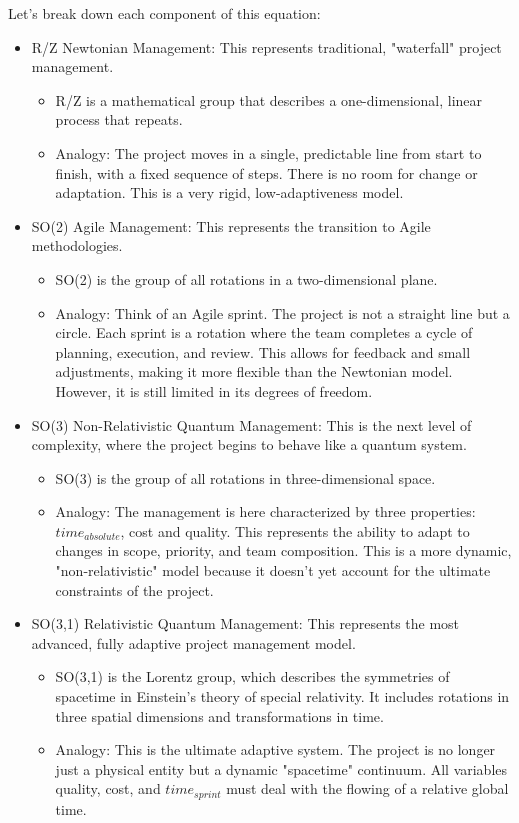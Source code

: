 \documentclass{article}
\begin{document}
Let's break down each component of this equation:
\begin{itemize}
\item R/Z Newtonian Management: This represents traditional, "waterfall" project management.
\begin{itemize}
\item R/Z is a mathematical group that describes a one-dimensional, linear process that repeats.
\item Analogy: The project moves in a single, predictable line from start to finish, with a fixed sequence of steps. There is no room for change or adaptation. This is a very rigid, low-adaptiveness model.
\end{itemize}
\item SO(2) Agile Management: This represents the transition to Agile methodologies.
\begin{itemize}
\item SO(2) is the group of all rotations in a two-dimensional plane.
\item Analogy: Think of an Agile sprint. The project is not a straight line but a circle. Each sprint is a rotation where the team completes a cycle of planning, execution, and review. This allows for feedback and small adjustments, making it more flexible than the Newtonian model. However, it is still limited in its degrees of freedom.
\end{itemize}
\item SO(3) Non-Relativistic Quantum Management: This is the next level of complexity, where the project begins to behave like a quantum system.
\begin{itemize}
\item SO(3) is the group of all rotations in three-dimensional space.
\item Analogy: The management is here characterized by three properties: $time_{absolute}$, cost and quality. This represents the ability to adapt to changes in scope, priority, and team composition. This is a more dynamic, "non-relativistic" model because it doesn't yet account for the ultimate constraints of the project.
\end{itemize}
\item SO(3,1) Relativistic Quantum Management: This represents the most advanced, fully adaptive project management model.
\begin{itemize}
\item SO(3,1) is the Lorentz group, which describes the symmetries of spacetime in Einstein's theory of special relativity. It includes rotations in three spatial dimensions and transformations in time.
\item Analogy: This is the ultimate adaptive system. The project is no longer just a physical entity but a dynamic "spacetime" continuum. All variables quality, cost, and $time_{sprint}$ must deal with the flowing of a relative global time.
\end{itemize}
\end{itemize}
\end{document}
